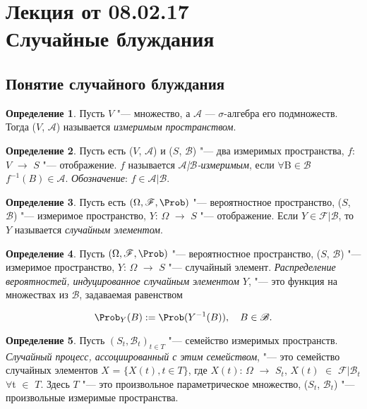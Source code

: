\documentclass[a4paper]{article}
\theoremstyle{plain}
\theoremstyle{definition}
\newtheorem{defn}{Определение}[section]
\theoremstyle{remark}
\begin{document}
\tableofcontents

\section[Лекция от 08.02.17. Случайные блуждания]{Лекция от 08.02.17\\ {\large Случайные блуждания}}

\subsection{Понятие случайного блуждания}

\begin{defn}
  Пусть $V$ "--- множество, а $\mathscr{A}$ — $\sigma$-алгебра его подмножеств. Тогда ($V$, $\mathscr{A}$) называется \emph{измеримым пространством}.
\end{defn}

\begin{defn}
  Пусть есть ($V$, $\mathscr{A}$) и ($S$, $\mathscr{B}$) "--- два измеримых пространства, $f$: $V$ $\rightarrow$ $S$ "--- отображение. $f$ называется \emph{$\mathscr{A}$|$\mathscr{B}$-измеримым}, если $\forall$B$\in\mathscr{B}$ $f^{-1}(B)\in\mathscr{A}$. \emph{Обозначение}: $f\in\mathscr{A}|\mathscr{B}$.
\end{defn}

\begin{defn}
  Пусть есть $(\Omega, \mathscr{F}, \Prob)$ "--- вероятностное пространство, \linebreak($S$, $\mathscr{B}$) "--- измеримое пространство, $Y$: $\Omega$ $\rightarrow$ $S$ "--- отображение. Если $Y\in\mathscr{F}|\mathscr{B}$, то $Y$ называется \emph{случайным элементом}.
\end{defn}

\begin{defn}
  Пусть $(\Omega, \mathscr{F}, \Prob)$ "--- вероятностное пространство, \linebreak($S$, $\mathscr{B}$) "--- измеримое пространство, $Y$: $\Omega$ $\rightarrow$ $S$ "--- случайный элемент. \emph{Распределение вероятностей, индуцированное случайным элементом $Y$}, "--- это функция на множествах из $\mathscr{B}$, задаваемая равенством

  \begin{equation*}
    \Prob_{Y}(B):= \Prob(Y^{-1}(B)), \quad B\in\mathscr{B}.
  \end{equation*}
\end{defn}

\begin{defn}
  Пусть $(S_{t}, \mathscr{B}_{t})_{t \in T}$ "--- семейство измеримых пространств. \emph{Случайный процесс, ассоциированный с этим семейством}, "--- это семейство случайных элементов $X$ = $\lbrace X(t){,} t \in T \rbrace$, где $X(t)$: $\Omega$ $\rightarrow$ $S_{t}$, $X(t)$ $\in$ $\mathscr{F}|\mathscr{B}_{t}$ \linebreak $\forall$t $\in$ $T$. Здесь $T$ "--- это произвольное параметрическое множество, ($S_{t}$, $\mathscr{B}_{t}$) "--- произвольные измеримые пространства.
\end{defn}
\end{document}
